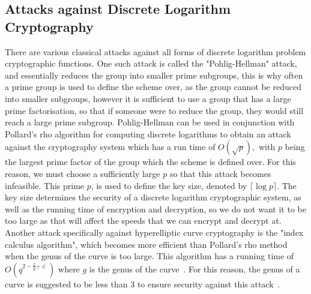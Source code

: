 \subsection{Attacks against Discrete Logarithm Cryptography}
There are various classical attacks against all forms of discrete logarithm problem cryptographic functions. One such attack is called the "Pohlig-Hellman" attack, and essentially reduces the group into smaller prime subgroups, this is why often a prime group is used to define the scheme over, as the group cannot be reduced into smaller subgroups, however it is sufficient to use a group that has a large prime factorisation, so that if someone were to reduce the group, they would still reach a large prime subgroup. Pohlig-Hellman can be used in conjunction with Pollard's rho algorithm for computing discrete logarithms to obtain an attack against the cryptography system which has a run time of $\textit{O}(\sqrt{p}),$ with $p$ being the largest prime factor of the group which the scheme is defined over. For this reason, we must choose a sufficiently large $p$ so that this attack becomes infeasible. This prime $p$, is used to define the key size, denoted by $\lceil \log p \rceil $. The key size determines the security of a discrete logarithm cryptographic system, as well as the running time of encryption and decryption, so we do not want it to be too large as that will affect the speeds that we can encrypt and decrypt at. Another attack specifically against hyperelliptic curve cryptography is the "index calculus algorithm", which becomes more efficient than Pollard's rho method when the genus of the curve is too large. This algorithm has a running time of $\textit{O}(q^{2-\frac{2}{g}+\in})$ where $g$ is the genus of the curve~\cite{theriault2003index}. For this reason, the genus of a curve is suggested to be less than 3 to ensure security against this attack~\cite{scholten2003introduction}.